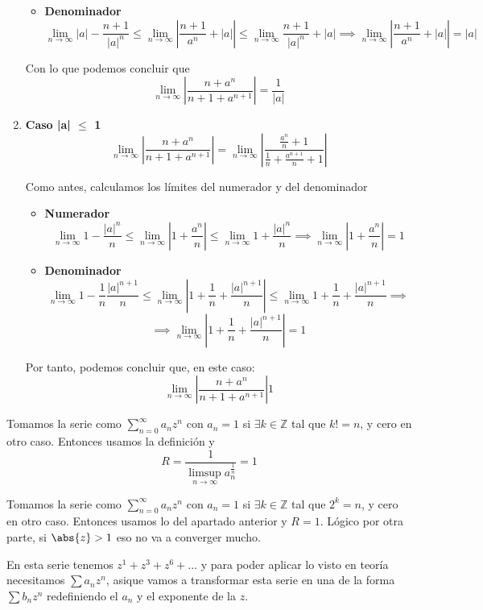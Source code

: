 \begin{problem}[12]
\begin{enumerate}
\begin{itemize}
\item \textbf{Denominador}
\[\lim_{n \to \infty} |a|-\frac{n+1}{|a|^n}\leq \lim_{n \to \infty} \left|\frac{n+1}{a^n}+|a| \right| \leq \lim_{n \to \infty} \frac{n+1}{|a|^n}+|a| \implies \lim_{n \to \infty} \left|\frac{n+1}{a^n}+|a| \right|  = |a|\]
\end{itemize}

Con lo que podemos concluir que
\[\lim_{n\to \infty}\left| \frac{n+a^n}{n+1+a^{n+1}}\right| = \frac{1}{|a|}\]

\item \textbf{Caso |a| $\leq$ 1}
\[\lim_{n\to \infty}\left| \frac{n+a^n}{n+1+a^{n+1}}\right| = \lim_{n \to \infty} \left|\frac{\frac{a^n}{n}+1}{\frac{1}{n}+\frac{a^{n+1}}{n}+1} \right| \]

Como antes, calculamos los límites del numerador y del denominador
\begin{itemize}
\item \textbf{Numerador}
\[\lim_{n\to \infty} 1-\frac{|a|^n}{n} \leq \lim_{n\to \infty}\left| 1+\frac{a^n}{n} \right|  \leq \lim_{n\to \infty}1+\frac{|a|^n}{n} \implies \lim_{n\to \infty} \left| 1+\frac{a^n}{n} \right| = 1\]

\item \textbf{Denominador}
\[\lim_{n\to \infty}1-\frac{1}{n}\frac{|a|^{n+1}}{n} \leq \lim_{n\to \infty}\left| 1 + \frac{1}{n} + \frac{|a|^{n+1}}{n} \right| \leq \lim_{n\to \infty}1 + \frac{1}{n}+\frac{|a|^{n+1}}{n} \implies\]
\[\implies \lim_{n\to \infty}\left| 1 + \frac{1}{n} + \frac{|a|^{n+1}}{n} \right|  = 1\]
\end{itemize}
Por tanto, podemos concluir que, en este caso:
\[\lim_{n\to \infty}\left| \frac{n+a^n}{n+1+a^{n+1}}\right| 1 \]
\end{enumerate}

\spart Tomamos la serie como $\sum_{n=0}^∞ a_n z^n$ con $a_n = 1$ si $∃k ∈ ℤ$ tal que $k! = n$, y cero en otro caso. Entonces usamos la definición y \[ R = \frac{1}{\limsup_{n\to∞} a_n^{\frac{1}{n}}} = 1 \]

\spart Tomamos la serie como $\sum_{n=0}^∞ a_nz^n$ con $a_n = 1$ si $∃k ∈ ℤ$ tal que $2^k = n$, y cero en otro caso. Entonces usamos lo del apartado anterior y $R = 1$. Lógico por otra parte, si $\abs{z} > 1$ eso no va a converger mucho.

\spart[i]

En esta serie tenemos $z^1 + z^3 + z^6+...$ y para poder aplicar lo visto en teoría necesitamos $\sum a_n z^n$, asique vamos a transformar esta serie en una de la forma $\sum b_n z^n$ redefiniendo el $a_n$ y el exponente de la $z$.



\end{problem}

